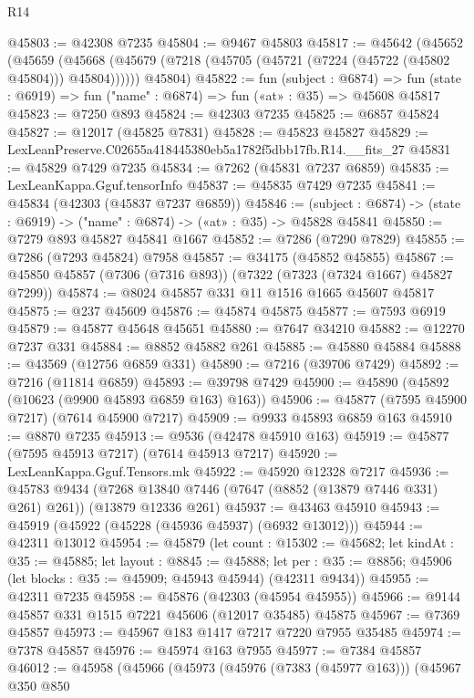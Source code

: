 \begin{lexlean}{R14}
\begin{coremodule}
@45803 := @42308 @7235
@45804 := @9467 @45803
@45817 := @45642
    (@45652
      (@45659 (@45668 (@45679 (@7218 (@45705 (@45721 (@7224 (@45722 (@45802 @45804))) @45804))))))
      @45804)
@45822 := fun (subject : @6874) =>
  fun (state : @6919) => fun ("name" : @6874) => fun («at» : @35) => @45608 @45817
@45823 := @7250 @893
@45824 := @42303 @7235
@45825 := @6857 @45824
@45827 := @12017 (@45825 @7831)
@45828 := @45823 @45827
@45829 := LexLeanPreserve.C02655a418445380eb5a1782f5dbb17fb.R14.__fits_27
@45831 := @45829 @7429 @7235
@45834 := @7262 (@45831 @7237 @6859)
@45835 := LexLeanKappa.Gguf.tensorInfo
@45837 := @45835 @7429 @7235
@45841 := @45834 (@42303 (@45837 @7237 @6859))
@45846 := (subject : @6874) -> (state : @6919) -> ("name" : @6874) -> («at» : @35) -> @45828 @45841
@45850 := @7279 @893 @45827 @45841 @1667
@45852 := @7286 (@7290 @7829)
@45855 := @7286 (@7293 @45824) @7958
@45857 := @34175 (@45852 @45855)
@45867 := @45850 @45857 (@7306 (@7316 @893)) (@7322 (@7323 (@7324 @1667) @45827 @7299))
@45874 := @8024 @45857 @331 @11 @1516 @1665 @45607 @45817
@45875 := @237 @45609
@45876 := @45874 @45875
@45877 := @7593 @6919
@45879 := @45877 @45648 @45651
@45880 := @7647 @34210
@45882 := @12270 @7237 @331
@45884 := @8852 @45882 @261
@45885 := @45880 @45884
@45888 := @43569 (@12756 @6859 @331)
@45890 := @7216 (@39706 @7429)
@45892 := @7216 (@11814 @6859)
@45893 := @39798 @7429
@45900 := @45890 (@45892 (@10623 (@9900 @45893 @6859 @163) @163))
@45906 := @45877 (@7595 @45900 @7217) (@7614 @45900 @7217)
@45909 := @9933 @45893 @6859 @163
@45910 := @8870 @7235
@45913 := @9536 (@42478 @45910 @163)
@45919 := @45877 (@7595 @45913 @7217) (@7614 @45913 @7217)
@45920 := LexLeanKappa.Gguf.Tensors.mk
@45922 := @45920 @12328 @7217
@45936 := @45783
    @9434
    (@7268 @13840 @7446 (@7647 (@8852 (@13879 @7446 @331) @261) @261))
    (@13879 @12336 @261)
@45937 := @43463 @45910
@45943 := @45919 (@45922 (@45228 (@45936 @45937) (@6932 @13012)))
@45944 := @42311 @13012
@45954 := @45879
    (let count : @15302 := @45682;
    let kindAt : @35 := @45885;
    let layout : @8845 := @45888;
    let per : @35 := @8856; @45906 (let blocks : @35 := @45909; @45943 @45944) (@42311 @9434))
@45955 := @42311 @7235
@45958 := @45876 (@42303 (@45954 @45955))
@45966 := @9144 @45857 @331 @1515 @7221 @45606 (@12017 @35485) @45875
@45967 := @7369 @45857
@45973 := @45967 @183 @1417 @7217 @7220 @7955 @35485
@45974 := @7378 @45857
@45976 := @45974 @163 @7955
@45977 := @7384 @45857
@46012 := @45958
    (@45966
      (@45973
        (@45976 (@7383 (@45977 @163)))
        (@45967
          @350
          @850

\end{coremodule}
\end{lexlean}
